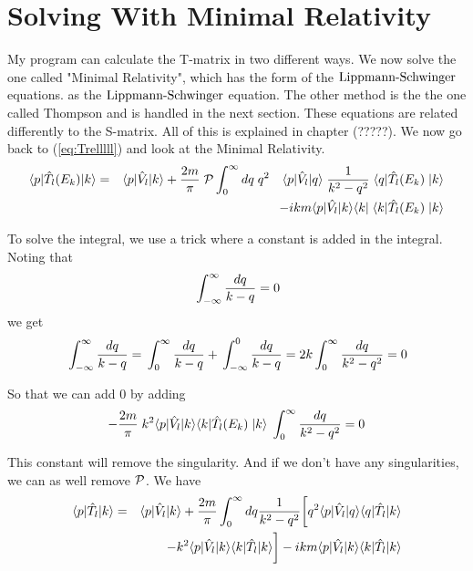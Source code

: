 \section{Solving With Minimal Relativity} 
My program can calculate the T-matrix in two different ways. We now solve the one called "Minimal Relativity", 
which has the form of the $\text{Lippmann-Schwinger}$ equations.
as the $\text{Lippmann-Schwinger}$ equation. 
The other method is the the one called Thompson and is handled in the next section.
These equations are related differently to the S-matrix. All of this is  explained in chapter (?????).
We now go back to (\ref{eq:Trelllll}) and look at the Minimal Relativity. 
\begin{eqnarray}\label{eq:Trellllla}
\braketm{{ p}} {\op{T}_l(E_{ k})}{{ k}}&=&\braketm{{ p}}{\op{V}_l}{{ k}}
+ \frac{2m}{\pi}\;{\cal P}\int^{\infty}_{0}d { q}\; q^2 \quad\bra{{ p}}\op{V}_l\ket{{ q}}
\;\inv{{ k^2}-{ q^2}}   \;\bra{{ q}} \op{T}_l(E_{ k})\;\ket{{ k}}\nonumber\\
&&
-i { k}m \bra{{ p}}\op{V_l}\ket{{ k}}\bra{{ k}}
\;\bra{{ k}}\op{T}_l(E_{ k})\;\ket{{ k}}
\end{eqnarray}

To solve the integral, we use a trick where a constant is added in the integral. 
Noting that
\begin{equation}
{\cal }\int^{\infty}_{-\infty}\frac{d q}{k-{ q}}=0
\end{equation}
we get
\begin{equation}
{\cal }\int^{\infty}_{-\infty}\frac{d q}{k-{ q}}
=
{\cal }\int^{\infty}_{0}\frac{d q}{k-{ q}}+{\cal }\int^{0}_{-\infty}\frac{d q}{k-{ q}}
=
2k{\cal }\int^{\infty}_{0}\frac{d q}{k^2-{ q^2}}=0
\end{equation}


So that we can add 0 by adding
\begin{equation}\label{eq:trix0}
-\frac{2m}{\pi}\;k^2\bra{{ p}}\op{V}_l\ket{{ k}}    
\bra{{ k}} \op{T}_l(E_{ k})\;\ket{{ k}}\;{\cal }\int^{\infty}_{0}\frac{d q}{k^2-{ q^2}}=0
\end{equation}


This constant will remove the singularity. And if we 
don't have any singularities, we can as well remove ${\cal P}$. We have 
\begin{eqnarray}\label{eq:Trelllllaa}
\braketm{{ p}} {\op{T}_l}{{ k}}&=&\braketm{{ p}}{\op{V}_l}{{ k}}
+ \frac{2m}{\pi}\int^{\infty}_{0}d { q}
\inv{{ k^2}-{ q^2}}\bigg[ q^2\bra{{ p}}\op{V}_l\ket{{ q}} \bra{{ q}} \op{T}_l\ket{{ k}}\nonumber\\
&&-
k^2\bra{{ p}}\op{V}_l\ket{{ k}}
\bra{{ k}} \op{T}_l\ket{{ k}}\bigg]
-i { k}m \bra{{ p}}\op{V_l}\ket{{ k}}
\bra{{ k}}\op{T}_l\ket{{ k}}
\end{eqnarray}

